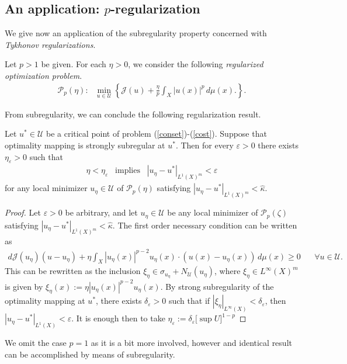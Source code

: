 \documentclass[hidelinks,onefignum,onetabnum]{siamart220329}
\begin{document}
\subsection{An application: $p$-regularization}	
We give now an application of the subregularity property concerned with \textit{Tykhonov  regularizations}.

Let $p>1$ be given. For each $\eta>0$, we consider the following \textit{regularized optimization problem}.
\begin{align*}
	\mathcal P_p(\eta):\,\,\,\,\min_{u\in\mathcal U}\left\lbrace \mathcal J(u)+\frac{\eta}{p}\int_{X}|u(x)|^p\,d\mu(x).\right\rbrace.
\end{align*}


From subregularity, we can conclude the following regularization result.
\begin{theorem}\label{regloc}
	Let $u^*\in\mathcal U$ be a critical point of problem (\ref{conset})-(\ref{cost}). Suppose that optimality mapping is strongly subregular at $u^*$. Then for every $\varepsilon>0$ there exists $\eta_\varepsilon>0$ such that  
	\begin{align*}
		\eta<\eta_\varepsilon \,\,\,\,\, \text{implies}	\,\,\,\,\,|u_{\eta}-u^*|_{L^1(X)^m}<\varepsilon
	\end{align*}
	for any local minimizer $u_{\eta}\in\mathcal U$ of $\mathcal P_p(\eta)$ satisfying $|u_{\eta}-u^*|_{L^1(X)^m}<\hat \kappa$.
\end{theorem}
\begin{proof}
	Let $\varepsilon>0$ be arbitrary, and 
let $u_\eta\in\mathcal U$ be any local minimizer of $\mathcal P_p(\zeta)$ satisfying $|u_{\eta}-u^*|_{L^1(X)^m}<\hat \kappa$. The first order necessary condition can be written as
\begin{align*}
	d\mathcal J(u_\eta)(u-u_\eta)+\eta\int_X |u_\eta(x)|^{p-2} u_\eta(x)\cdot (u(x)-u_\eta(x))\, d\mu(x)\ge0\quad\text{ $\forall u\in\mathcal U$.}
\end{align*}
This can be rewritten as the inclusion $\xi_\eta\in \sigma_{u_\eta}+N_{\mathcal U}(u_\eta)$, 
where $\xi_\eta\in L^\infty(X)^m$ is given by $\xi_\eta(x):=\eta|u_\eta(x)|^{p-2} u_\eta(x)$.
By strong subregularity of the optimality mapping at $u^*$, there exists $\delta_\varepsilon>0$ such that if $|\xi_\eta|_{L^\infty(X)}<\delta_\varepsilon$, then $|u_\eta-u^*|_{L^1(X)}<\varepsilon$. It is enough then to take $\eta_\varepsilon:=\delta_\varepsilon\big[\sup U\big]^{1-p}$
\end{proof}


We omit the case $p=1$ as it is a bit more involved, however and identical result can be accomplished by means of subregularity.
\end{document}
